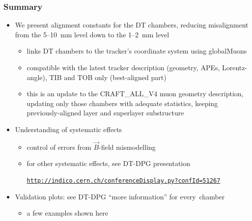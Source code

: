 \documentclass[compress]{beamer}
\begin{document}
\begin{frame}
\frametitle{Summary}
\begin{itemize}
\item We present alignment constants for the DT chambers, reducing
  misalignment from the 5--10~mm level down to the 1--2~mm level
\begin{itemize}
\item links DT chambers to the tracker's coordinate system using globalMuons
\item compatible with the latest tracker description (geometry, APEs,
  Lorentz-angle), TIB and TOB only (best-aligned part)
\item this is an update to the CRAFT\_ALL\_V4 muon geometry
  description, updating only those chambers with adequate statistics,
  keeping previously-aligned layer and superlayer substructure
\end{itemize}

\item Understanding of systematic effects
\begin{itemize}
\item control of errors from $\vec{B}$-field mismodelling
\item for other systematic effects, see DT-DPG presentation

\textcolor{blue}{\tt \scriptsize \href{http://indico.cern.ch/conferenceDisplay.py?confId=51267}{http://indico.cern.ch/conferenceDisplay.py?confId=51267}}
\end{itemize}

\item Validation plots: see DT-DPG ``more information'' for \mbox{every chamber\hspace{-1 cm}}
\begin{itemize}
\item a few examples shown here
\end{itemize}
\end{itemize}
\end{frame}
\end{document}
